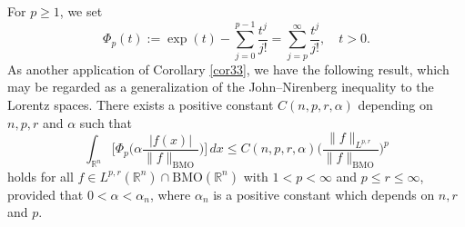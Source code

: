 \documentclass{birkjour}
\theoremstyle{definition}
\theoremstyle{remark}
\numberwithin{equation}{section}
\begin{document}
For $p\geq1$, we set
\begin{equation}\label{phif}
\Phi_p(t):=\exp(t)-\sum_{j=0}^{p-1}\frac{t^j}{j!}=\sum_{j=p}^{\infty}\frac{t^j}{j!},\quad t>0.
\end{equation}
As another application of Corollary \ref{cor33}, we have the following result, which may be regarded as a generalization of the John--Nirenberg inequality to the Lorentz spaces. There exists a positive constant $C({n,p,r,\alpha})$ depending on $n,p,r$ and $\alpha$ such that
\begin{equation}\label{bilinear14}
\int_{\mathbb R^n}\bigg[\Phi_p\Big(\alpha\frac{|f(x)|}{\|f\|_{\mathrm{BMO}}}\Big)\bigg]\,dx
\leq C({n,p,r,\alpha})\bigg(\frac{\|f\|_{L^{p,r}}}{\|f\|_{\mathrm{BMO}}}\bigg)^p
\end{equation}
holds for all $f\in L^{p,r}(\mathbb R^n)\cap\mathrm{BMO}(\mathbb R^n)$ with $1<p<\infty$ and $p\leq r\leq\infty$, provided that $0<\alpha<\alpha_n$, where $\alpha_n$ is a positive constant which depends on $n,r$ and $p$.
\end{document}
